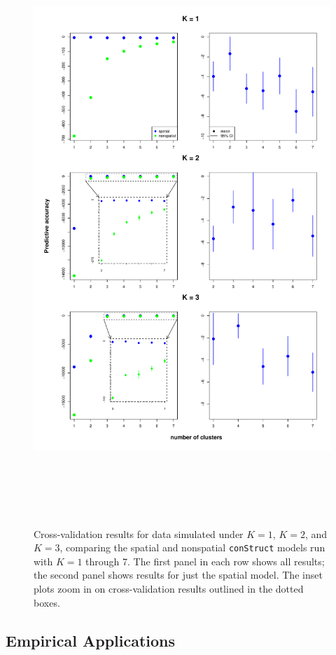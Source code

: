 \documentclass[12pt]{article}
\begin{document}
\begin{figure}
	\centering
		{\includegraphics[width=6in,height=8.5in]{figs/sims/xvals.pdf}}
	\caption{
	Cross-validation results for data simulated under $K=1$, $K=2$, and $K=3$, 
	comparing the spatial and nonspatial \texttt{conStruct} models run with $K=1$ through 7.  
	The first panel in each row shows all results; 
	the second panel shows results for just the spatial model.
	The inset plots zoom in on cross-validation results outlined in the dotted boxes.
    }\label{xvals}
\end{figure}

\subsection*{Empirical Applications}
\end{document}
